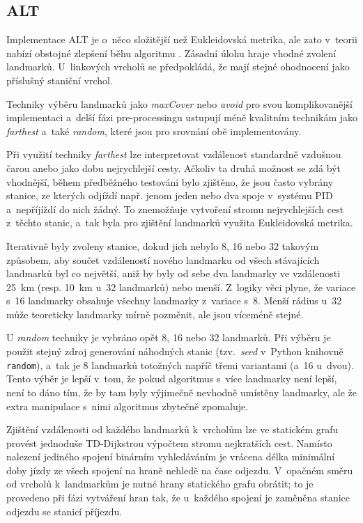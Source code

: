 \subsection{ALT}
Implementace ALT je o~něco složitější než Eukleidovská metrika, ale zato v~teorii nabízí obstojné zlepšení běhu algoritmu \cite{bauer2011experimental}. Zásadní úlohu hraje vhodné zvolení landmarků. U~linkových vrcholů se předpokládá, že mají stejné ohodnocení jako příslušný staniční vrchol.

Techniky výběru landmarků jako \textit{maxCover} nebo \textit{avoid} pro svou komplikovanější implementaci a~delší fázi pre-processingu ustupují méně kvalitním technikám jako \textit{farthest} a~také \textit{random}, které jsou pro srovnání obě implementovány.

Při využití techniky \textit{farthest} lze interpretovat vzdálenost standardně vzdušnou čarou anebo jako dobu nejrychlejší cesty. Ačkoliv ta druhá možnost se zdá být vhodnější, během předběžného testování bylo zjištěno, že jsou často vybrány stanice, ze kterých odjíždí např. jenom jeden nebo dva spoje v~systému PID a~nepříjíždí do nich žádný. To znemožňuje vytvoření stromu nejrychlejších cest z~těchto stanic, a~tak byla pro zjištění landmarků využita Eukleidovská metrika.

Iterativně byly zvoleny stanice, dokud jich nebylo 8, 16 nebo 32 takovým způsobem, aby součet vzdáleností nového landmarku od všech stávajících landmarků byl co největší, aniž by byly od sebe dva landmarky ve vzdálenosti 25~km (resp. 10~km u~32 landmarků) nebo menší. Z~logiky věci plyne, že variace s~16 landmarky obsahuje všechny landmarky z~variace s~8. Menší rádius u~32 může teoreticky landmarky mírně pozměnit, ale jsou víceméně stejné.  

U \textit{random} techniky je vybráno opět 8, 16 nebo 32 landmarků. Při výběru je použit stejný zdroj generování náhodných stanic (tzv.~\textit{seed} v~Python knihovně \texttt{random}), a~tak je 8 landmarků totožných napříč třemi variantami (a~16 u~dvou). Tento výběr je lepší v~tom, že pokud algoritmus s~více landmarky není lepší, není to dáno tím, že by tam byly výjimečně nevhodně umístěny landmarky, ale že extra manipulace s~nimi algoritmus zbytečně zpomaluje.

Zjištění vzdálenosti od každého landmarků k~vrcholům lze ve statickém grafu provést jednoduše TD-Dijkstrou výpočtem stromu nejkratších cest. Namísto nalezení jediného spojení binárním vyhledáváním je vrácena délka minimální doby jízdy ze všech spojení na hraně nehledě na čase odjezdu. V~opačném směru od vrcholů k~landmarkům je nutné hrany statického grafu obrátit; to je provedeno při fázi vytváření hran tak, že u~každého spojení je zaměněna stanice odjezdu se stanicí příjezdu. 

